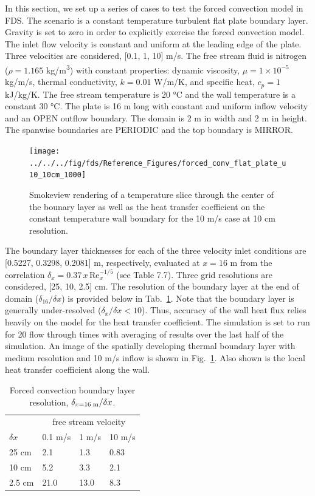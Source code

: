 \documentclass[11pt]{book}
\begin{document}
In this section, we set up a series of cases to test the forced convection model in FDS.  The scenario is a constant temperature turbulent flat plate boundary layer.  Gravity is set to zero in order to explicitly exercise the forced convection model.  The inlet flow velocity is constant and uniform at the leading edge of the plate.  Three velocities are considered, [0.1, 1, 10] m/s.  The free stream fluid is nitrogen ($\rho=1.165$ \si{kg/m^3}) with constant properties: dynamic viscosity, $\mu=1 \times 10^{-5}$ \si{kg/m/s}, thermal conductivity, $k=0.01$ \si{W/m/K}, and specific heat, $c_p=1$ \si{kJ/kg/K}.  The free stream temperature is 20 \si{\degreeCelsius} and the wall temperature is a constant 30 \si{\degreeCelsius}.  The plate is 16 m long with constant and uniform inflow velocity and an {\ct OPEN} outflow boundary.  The domain is 2 m in width and 2 m in height.  The spanwise boundaries are {\ct PERIODIC} and the top boundary is {\ct MIRROR}.

\begin{figure}[h]
   \centering
   \texttt{[image: ../../../fig/fds/Reference\_Figures/forced\_conv\_flat\_plate\_u10\_10cm\_1000]}
   \caption[Forced convection flat plate boundary layer]{\label{fig_forced_conv_image} Smokeview rendering of a temperature slice through the center of the bounary layer as well as the heat transfer coefficient on the constant temperature wall boundary for the 10 m/s case at 10 cm resolution.}
\end{figure}

The boundary layer thicknesses for each of the three velocity inlet conditions are [0.5227, 0.3298, 0.2081] m, respectively, evaluated at $x=16$ m from the correlation $\delta_x = 0.37\,x\,\mbox{Re}_x^{-1/5}$ (see \cite{Incropera:1} Table 7.7).  Three grid resolutions are considered, [25, 10, 2.5] cm.  The resolution of the boundary layer at the end of domain ($\delta_{16}/\delta x$) is provided below in Tab.~\ref{tab:bl_resolution}. Note that the boundary layer is generally under-resolved ($\delta_x/\delta x<10$).  Thus, accuracy of the wall heat flux relies heavily on the model for the heat transfer coefficient.  The simulation is set to run for 20 flow through times with averaging of results over the last half of the simulation.  An image of the spatially developing thermal boundary layer with medium resolution and 10 m/s inflow is shown in Fig.~\ref{fig_forced_conv_image}.  Also shown is the local heat transfer coefficient along the wall.

\begin{table}[h]
\centering
\caption[Forced convection boundary layer resolution]{Forced convection boundary layer resolution, $\delta_{x=16\;\mbox{\scriptsize m}}/\delta x$.}
\label{tab:bl_resolution}
\begin{tabular}{l|lll}
           & \multicolumn{3}{c}{free stream velocity} \\
$\delta x$ & 0.1 m/s & 1 m/s & 10 m/s \\
\hline
25 cm    & 2.1  & 1.3   & 0.83 \\
10 cm    & 5.2  & 3.3   & 2.1  \\
2.5 cm   & 21.0 & 13.0  & 8.3
\end{tabular}
\end{table}
\end{document}
